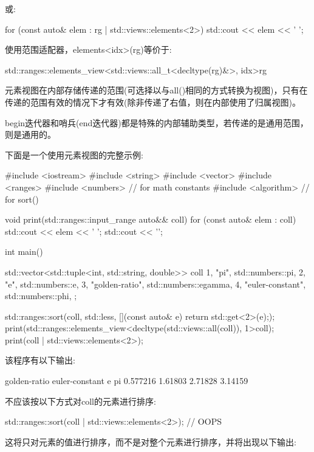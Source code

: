 或:

\begin{cpp}
for (const auto& elem : rg | std::views::elements<2>) {
	std::cout << elem << ' ';
}
\end{cpp}

使用范围适配器，elements<idx>(rg)等价于:

\begin{cpp}
std::ranges::elements_view<std::views::all_t<decltype(rg)&>, idx>{rg}
\end{cpp}

元素视图在内部存储传递的范围(可选择以与all()相同的方式转换为视图)，只有在传递的范围有效的情况下才有效(除非传递了右值，则在内部使用了归属视图)。

begin迭代器和哨兵(end迭代器)都是特殊的内部辅助类型，若传递的是通用范围，则是通用的。

下面是一个使用元素视图的完整示例:


\begin{cpp}
#include <iostream>
#include <string>
#include <vector>
#include <ranges>
#include <numbers> // for math constants
#include <algorithm> // for sort()

void print(std::ranges::input_range auto&& coll)
{
	for (const auto& elem : coll) {
		std::cout << elem << ' ';
	}
	std::cout << '\n';
}

int main()
{
	std::vector<std::tuple<int, std::string, double>> coll{
		{1, "pi", std::numbers::pi},
		{2, "e", std::numbers::e},
		{3, "golden-ratio", std::numbers::egamma},
		{4, "euler-constant", std::numbers::phi},
	};
	
	std::ranges::sort(coll, std::less{},
					  [](const auto& e) {return std::get<2>(e);});
	print(std::ranges::elements_view<decltype(std::views::all(coll)), 1>{coll});
	print(coll | std::views::elements<2>);
}
\end{cpp}

该程序有以下输出:

\begin{shell}
golden-ratio euler-constant e pi
0.577216 1.61803 2.71828 3.14159
\end{shell}

不应该按以下方式对coll的元素进行排序:

\begin{cpp}
std::ranges::sort(coll | std::views::elements<2>); // OOPS
\end{cpp}

这将只对元素的值进行排序，而不是对整个元素进行排序，并将出现以下输出:


